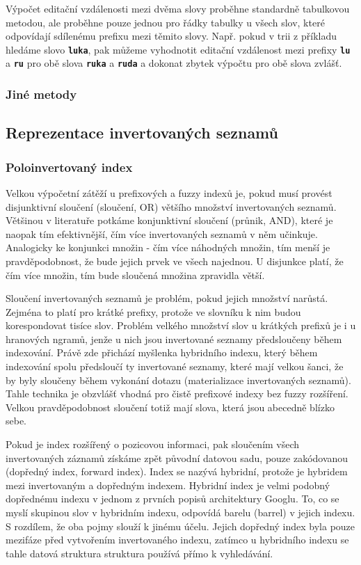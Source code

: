 \documentclass[11pt,letterpaper,oneside,openright]{book}
\newcommand{\bftt}[1]{\texttt{\textbf{#1}}}
\begin{document}
Výpočet editační vzdálenosti mezi dvěma slovy proběhne standardně tabulkovou
metodou, ale proběhne pouze jednou pro řádky tabulky u všech slov, které
odpovídají sdílenému prefixu mezi těmito slovy. Např. pokud v trii z příkladu
hledáme slovo \bftt{luka}, pak můžeme vyhodnotit editační vzdálenost mezi
prefixy \bftt{lu} a \bftt{ru} pro obě slova \bftt{ruka} a \bftt{ruda} a dokonat
zbytek výpočtu pro obě slova zvlášť.



\subsubsection{Jiné metody}

\subsection{Reprezentace invertovaných seznamů}

\subsubsection{Poloinvertovaný index}
Velkou výpočetní zátěží u prefixových a fuzzy indexů je, pokud musí provést
disjunktivní sloučení (sloučení, OR) většího množství invertovaných seznamů.
Většinou v literatuře potkáme konjunktivní sloučení (průnik, AND), které je
naopak tím efektivnější, čím více invertovaných seznamů v něm učinkuje.
Analogicky ke konjunkci množin - čím více náhodných množin, tím menší je
pravděpodobnost, že bude jejich prvek ve všech najednou. U disjunkce platí, že
čím více množin, tím bude sloučená množina zpravidla větší.

Sloučení invertovaných seznamů je problém, pokud jejich množství narůstá.
Zejména to platí pro krátké prefixy, protože ve slovníku k nim budou
korespondovat tisíce slov. Problém velkého množství slov u krátkých prefixů je
i u hranových ngramů, jenže u nich jsou invertované seznamy předsloučeny během
indexování. Právě zde přichází myšlenka hybridního indexu, který během
indexování spolu předsloučí ty invertované seznamy, které mají velkou šanci, že
by byly sloučeny během vykonání dotazu (materializace invertovaných seznamů).
Tahle technika je obzvlášť vhodná pro čistě prefixové indexy bez fuzzy
rozšíření. Velkou pravděpodobnost sloučení totiž mají slova, která jsou
abecedně blízko sebe.

Pokud je index rozšířený o pozicovou informaci, pak sloučením všech
invertovaných záznamů získáme zpět původní datovou sadu, pouze zakódovanou
(dopředný index, forward index). Index se nazývá hybridní, protože je hybridem
mezi invertovaným a dopředným indexem.  Hybridní index je velmi podobný
dopřednému indexu v jednom z prvních popisů architektury Googlu. To, co se
myslí skupinou slov v hybridním indexu, odpovídá barelu (barrel) v jejich
indexu. S rozdílem, že oba pojmy slouží k jinému účelu. Jejich dopředný index
byla pouze mezifáze před vytvořením invertovaného indexu, zatímco u hybridního
indexu se tahle datová struktura struktura používá přímo k vyhledávání.
\end{document}
